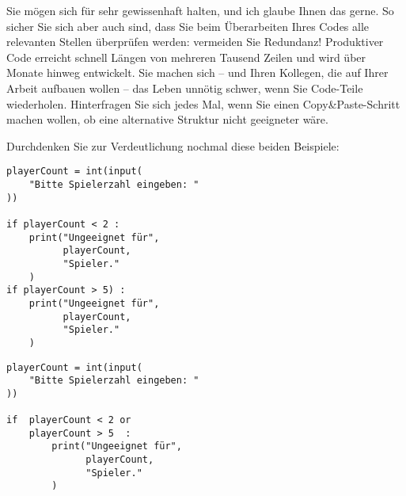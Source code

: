 \begin{warnbox}
Sie mögen sich für sehr gewissenhaft halten, und ich glaube Ihnen das gerne. So sicher Sie sich aber auch sind, dass Sie beim Überarbeiten Ihres Codes alle relevanten Stellen überprüfen werden: vermeiden Sie Redundanz! Produktiver Code erreicht schnell Längen von mehreren Tausend Zeilen und wird über Monate hinweg entwickelt. Sie machen sich -- und Ihren Kollegen, die auf Ihrer Arbeit aufbauen wollen -- das Leben unnötig schwer, wenn Sie Code-Teile wiederholen. Hinterfragen Sie sich jedes Mal, wenn Sie einen Copy\&Paste-Schritt machen wollen, ob eine alternative Struktur nicht geeigneter wäre.
\end{warnbox}

Durchdenken Sie zur Verdeutlichung nochmal diese beiden Beispiele:
\begin{tcbraster}[raster columns=2,
                  raster equal height,
                  nobeforeafter,
                  raster column skip=0.5cm]
	\begin{warnbox}[Gültigkeitsprüfung: Reihe von \texttt{if}s, leftupper=7mm]
	\begin{verbatim}
playerCount = int(input(
    "Bitte Spielerzahl eingeben: "
))
      
if playerCount < 2 :
    print("Ungeeignet für", 
          playerCount, 
          "Spieler."
    )
if playerCount > 5) :
    print("Ungeeignet für", 
          playerCount,
          "Spieler."
    )
	\end{verbatim}
	\end{warnbox}
%
	\begin{codebox}
	\begin{verbatim}
playerCount = int(input(
    "Bitte Spielerzahl eingeben: "
))
      
if  playerCount < 2 or
    playerCount > 5  :
        print("Ungeeignet für",
              playerCount,
              "Spieler."
        )
	\end{verbatim}
	\end{codebox}
\end{tcbraster}

